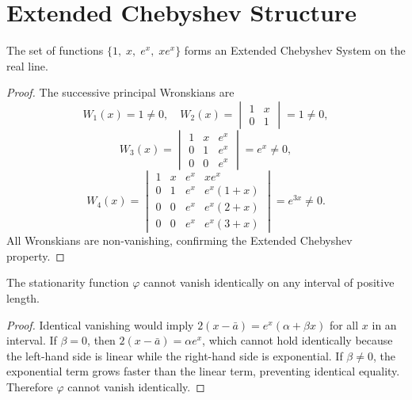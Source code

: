 \section{Extended Chebyshev Structure}
\begin{lemma}
\label{ch:lem:29-3}
The set of functions \(\{1,\;x,\;e^x,\;xe^x\}\) forms an Extended Chebyshev System on the real line.
\end{lemma}
\begin{proof}
The successive principal Wronskians are
\[
W_1(x)=1\neq0,\quad
W_2(x)=
\begin{vmatrix}
1 & x\\ 0 & 1
\end{vmatrix}=1\neq0,
\]
\[
W_3(x)=
\begin{vmatrix}
1 & x & e^x\\
0 & 1 & e^x\\
0 & 0 & e^x
\end{vmatrix}=e^x\neq0,
\]
\[
W_4(x)=
\begin{vmatrix}
1 & x & e^x & xe^x\\
0 & 1 & e^x & e^x(1+x)\\
0 & 0 & e^x & e^x(2+x)\\
0 & 0 & e^x & e^x(3+x)
\end{vmatrix}=e^{3x}\neq0.
\]
All Wronskians are non-vanishing, confirming the Extended Chebyshev property. 
\end{proof}
\begin{lemma}
\label{ch:lem:29-4}
The stationarity function \(\varphi\) cannot vanish identically on any interval of positive length.
\end{lemma}
\begin{proof}
Identical vanishing would imply \(2(x-\bar a)=e^x(\alpha+\beta x)\) for all \(x\) in an interval. If \(\beta=0\), then \(2(x-\bar a)=\alpha e^x\), which cannot hold identically because the left-hand side is linear while the right-hand side is exponential. If \(\beta\neq0\), the exponential term grows faster than the linear term, preventing identical equality. Therefore \(\varphi\) cannot vanish identically. 
\end{proof}

